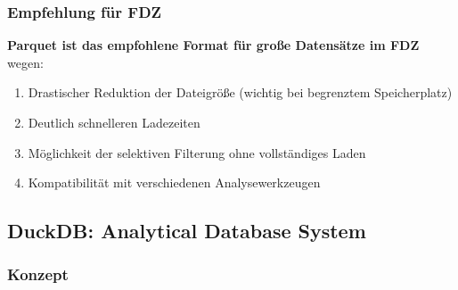 \documentclass[
  ngerman,
  10pt,
  twocolumn]{article}
\providecommand{\tightlist}{%
  \setlength{\itemsep}{0pt}\setlength{\parskip}{0pt}}
\let\origtable\table
\let\endorigtable\endtable
\renewenvironment{table}[1][htbp]{%
  \origtable*[#1]%
}{%
  \endorigtable*%
}
\begin{document}
\begin{table}

\caption{\label{tbl-format-comparison}Vergleich verschiedener
Datenformate für die BTP-Analyse}


\end{table}%

\subsubsection{Empfehlung für FDZ}\label{empfehlung-fuxfcr-fdz}

\textbf{Parquet ist das empfohlene Format für große Datensätze im FDZ}
wegen:

\begin{enumerate}
\def\labelenumi{\arabic{enumi}.}
\tightlist
\item
  Drastischer Reduktion der Dateigröße (wichtig bei begrenztem
  Speicherplatz)
\item
  Deutlich schnelleren Ladezeiten
\item
  Möglichkeit der selektiven Filterung ohne vollständiges Laden
\item
  Kompatibilität mit verschiedenen Analysewerkzeugen
\end{enumerate}

\subsection{DuckDB: Analytical Database
System}\label{duckdb-analytical-database-system}

\subsubsection{Konzept}\label{konzept}
\end{document}
